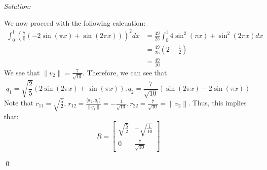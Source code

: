 \documentclass[12pt]{article}
\newenvironment{sol}
    {\emph{Solution:}
    }
    {
    \qed
    }
\begin{document}
\begin{sol}
\[    \] 
    We now proceed with the following calcuation:
    \begin{align*}
        \int_{0}^{1} \left( \frac{7}{5} (-2\sin(\pi x) + \sin(2 \pi x)) \right)^2 dx &= \frac{49}{25} \int_{0}^{1} 4\sin^2 (\pi x) + \sin^2(2\pi x) dx \\
        &=  \frac{49}{25} \left( 2 + \frac{1}{2} \right)\\
        &= \frac{49}{10}
    \end{align*}
    We see that $\| v_2\| = \frac{7}{\sqrt{10}}$. Therefore, we can see that 
    \[
    q_1 = \sqrt{\frac{2}{5}} (2\sin (2\pi x) + \sin(\pi x)), q_2 = \frac{7}{\sqrt{10}} \left( \sin(2 \pi x) - 2\sin(\pi x) \right)
    \]
    Note that $r_{11} = \sqrt{\frac{5}{2}}$, $r_{12} = \frac{\langle a_2, q_1 \rangle}{\|q_1\|} = -\frac{1}{\sqrt{10}}, r_{22} = \frac{7}{\sqrt{10}} = \|v_2\|$. Thus, this implies that:
    \[
    R = \begin{bmatrix}
        \sqrt{\frac{5}{2}} & -\sqrt{\frac{1}{10}} \\
        0 & \frac{7}{\sqrt{10}}
    \end{bmatrix}
    \]
\end{sol}
\end{document}
